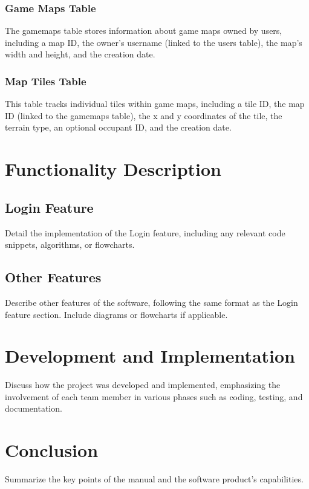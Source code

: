 \documentclass[12pt]{article}
\begin{document}
\subsubsection{Game Maps Table}
The game\textunderscore maps table stores information about game maps owned by users, including a map ID, the owner's username (linked to the users table), the map's width and height, and the creation date.

\subsubsection{Map Tiles Table}
This table tracks individual tiles within game maps, including a tile ID, the map ID (linked to the game\textunderscore maps table), the x and y coordinates of the tile, the terrain type, an optional occupant ID, and the creation date.

\section{Functionality Description}
\subsection{Login Feature}
Detail the implementation of the Login feature, including any relevant code snippets, algorithms, or flowcharts.

\subsection{Other Features}
Describe other features of the software, following the same format as the Login feature section. Include diagrams or flowcharts if applicable.

\section{Development and Implementation}
Discuss how the project was developed and implemented, emphasizing the involvement of each team member in various phases such as coding, testing, and documentation.

\section{Conclusion}
Summarize the key points of the manual and the software product's capabilities.
\end{document}

